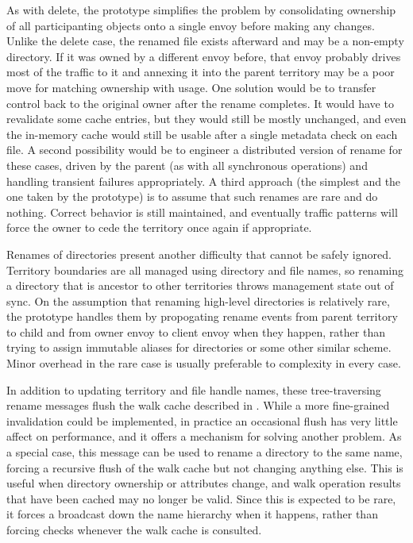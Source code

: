 As with delete, the prototype simplifies the problem by consolidating ownership of all participanting objects onto a single envoy before making any changes. Unlike the delete case, the renamed file exists afterward and may be a non-empty directory. If it was owned by a different envoy before, that envoy probably drives most of the traffic to it and annexing it into the parent territory may be a poor move for matching ownership with usage. One solution would be to transfer control back to the original owner after the rename completes. It would have to revalidate some cache entries, but they would still be mostly unchanged, and even the in-memory cache would still be usable after a single metadata check on each file. A second possibility would be to engineer a distributed version of rename for these cases, driven by the parent (as with all synchronous operations) and handling transient failures appropriately. A third approach (the simplest and the one taken by the prototype) is to assume that such renames are rare and do nothing. Correct behavior is still maintained, and eventually traffic patterns will force the owner to cede the territory once again if appropriate.

Renames of directories present another difficulty that cannot be safely ignored. Territory boundaries are all managed using directory and file names, so renaming a directory that is ancestor to other territories throws management state out of sync. On the assumption that renaming high-level directories is relatively rare, the prototype handles them by propogating rename events from parent territory to child and from owner envoy to client envoy when they happen, rather than trying to assign immutable aliases for directories or some other similar scheme. Minor overhead in the rare case is usually preferable to complexity in every case.

In addition to updating territory and file handle names, these tree-traversing rename messages flush the walk cache described in .  While a more fine-grained invalidation could be implemented, in practice an occasional flush has very little affect on performance, and it offers a mechanism for solving another problem. As a special case, this message can be used to rename a directory to the same name, forcing a recursive flush of the walk cache but not changing anything else. This is useful when directory ownership or attributes change, and walk operation results that have been cached may no longer be valid. Since this is expected to be rare, it forces a broadcast down the name hierarchy when it happens, rather than forcing checks whenever the walk cache is consulted.

